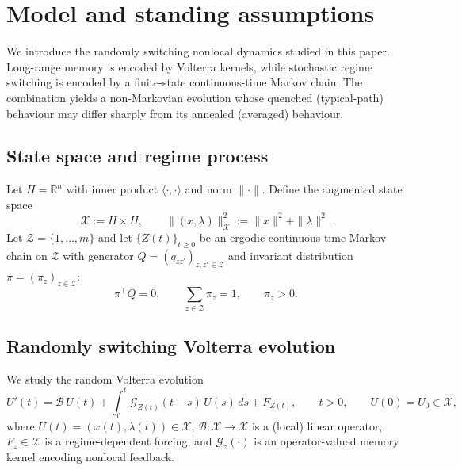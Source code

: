 \documentclass[12pt,a4paper]{article}
\theoremstyle{plain}
\theoremstyle{definition}
\theoremstyle{remark}
\begin{document}
\section{Model and standing assumptions}
\label{sec:model}

We introduce the randomly switching nonlocal dynamics studied in this paper.
Long-range memory is encoded by Volterra kernels, while stochastic regime switching is
encoded by a finite-state continuous-time Markov chain. The combination yields a
non-Markovian evolution whose quenched (typical-path) behaviour may differ sharply from
its annealed (averaged) behaviour.

\subsection{State space and regime process}
\label{subsec:state-regime}

Let $H=\mathbb{R}^n$ with inner product $\langle\cdot,\cdot\rangle$ and norm $\|\cdot\|$.
Define the augmented state space
\[
\mathcal X := H \times H, \qquad
\|(x,\lambda)\|_{\mathcal X}^2 := \|x\|^2 + \|\lambda\|^2.
\]
Let $\mathcal Z=\{1,\dots,m\}$ and let $\{Z(t)\}_{t\ge0}$ be an ergodic
continuous-time Markov chain on $\mathcal Z$ with generator
$Q=(q_{zz'})_{z,z'\in\mathcal Z}$ and invariant distribution $\pi=(\pi_z)_{z\in\mathcal Z}$:
\[
\pi^\top Q = 0,\qquad \sum_{z\in\mathcal Z}\pi_z=1,\qquad \pi_z>0.
\]

\subsection{Randomly switching Volterra evolution}
\label{subsec:random-volterra}

We study the random Volterra evolution
\begin{equation}
	\label{eq:main-switching}
	U'(t)
	=
	\mathcal B\,U(t)
	+
	\int_{0}^{t}\mathcal G_{Z(t)}(t-s)\,U(s)\,ds
	+
	F_{Z(t)},
	\qquad t>0,\qquad U(0)=U_0\in\mathcal X,
\end{equation}
where $U(t)=(x(t),\lambda(t))\in\mathcal X$,
$\mathcal B:\mathcal X\to\mathcal X$ is a (local) linear operator,
$F_z\in\mathcal X$ is a regime-dependent forcing, and $\mathcal G_z(\cdot)$ is an
operator-valued memory kernel encoding nonlocal feedback.
\end{document}
